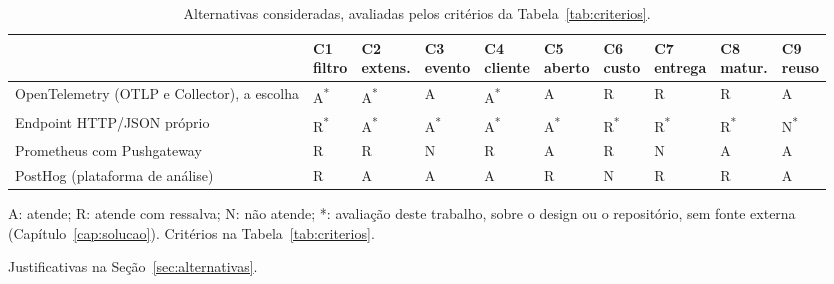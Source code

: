 \begin{table}[!ht]
  \centering
  \newcommand*{\cA}[1][]{A#1}
  \newcommand*{\cR}[1][]{\cellcolor{black!10}R#1}
  \newcommand*{\cN}[1][]{\cellcolor{black!25}N#1}
  \newcommand*{\cQ}[1][]{\textbf{?}#1}
  \newcommand*{\cNA}[1][]{n/a#1}
  \newcommand*{\nosso}{\textsuperscript{*}}
  \small
  \setlength{\tabcolsep}{3pt}
  \begin{threeparttable}
    \caption{Alternativas consideradas, avaliadas pelos critérios da
      Tabela~\ref{tab:criterios}.}
    \label{tab:alternativas}
    \begin{tabular}{@{}>{\raggedright\arraybackslash}p{3.9cm}
                      *{9}{>{\centering\arraybackslash}p{0.92cm}}@{}}
      \toprule
       & \makecell{C1\\[-2pt]\scriptsize filtro} & \makecell{C2\\[-2pt]\scriptsize extens.}
       & \makecell{C3\\[-2pt]\scriptsize evento} & \makecell{C4\\[-2pt]\scriptsize cliente}
       & \makecell{C5\\[-2pt]\scriptsize aberto} & \makecell{C6\\[-2pt]\scriptsize custo}
       & \makecell{C7\\[-2pt]\scriptsize entrega} & \makecell{C8\\[-2pt]\scriptsize matur.}
       & \makecell{C9\\[-2pt]\scriptsize reuso} \\
      \midrule
      OpenTelemetry (OTLP e Collector), a escolha
        & \cA[\nosso] & \cA[\nosso] & \cA & \cA[\nosso] & \cA
        & \cR & \cR & \cR & \cA \\
      Endpoint HTTP/JSON próprio
        & \cR[\nosso] & \cA[\nosso] & \cA[\nosso] & \cA[\nosso] & \cA[\nosso]
        & \cR[\nosso] & \cR[\nosso] & \cR[\nosso] & \cN[\nosso] \\
      Prometheus com Pushgateway
        & \cR & \cR & \cN & \cR & \cA
        & \cR & \cN & \cA & \cA \\
      PostHog (plataforma de análise)
        & \cR & \cA & \cA & \cA & \cR
        & \cN & \cR & \cR & \cA \\
      \bottomrule
    \end{tabular}
    \begin{tablenotes}
      \footnotesize
      \item A: atende; R: atende com ressalva; N: não atende; *: avaliação
        deste trabalho, sobre o design ou o repositório, sem fonte externa
        (Capítulo~\ref{cap:solucao}).
        Critérios na Tabela~\ref{tab:criterios}.
      \item Justificativas na Seção~\ref{sec:alternativas}.
    \end{tablenotes}
  \end{threeparttable}
\end{table}
